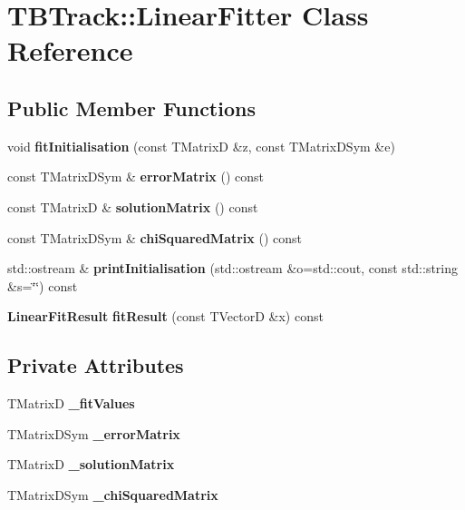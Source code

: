 \section{TBTrack::LinearFitter Class Reference}
\label{classTBTrack_1_1LinearFitter}
\subsection*{Public Member Functions}
\begin{DoxyCompactItemize}
\item 
void {\bfseries fitInitialisation} (const TMatrixD \&z, const TMatrixDSym \&e)\label{classTBTrack_1_1LinearFitter_af83e617778ace54723fba9d11eaad900}

\item 
const TMatrixDSym \& {\bfseries errorMatrix} () const \label{classTBTrack_1_1LinearFitter_ab3c00a9eb140ba63e0cae20e7db9df43}

\item 
const TMatrixD \& {\bfseries solutionMatrix} () const \label{classTBTrack_1_1LinearFitter_adb053f46cd4b1cabd89aafb802b14b4e}

\item 
const TMatrixDSym \& {\bfseries chiSquaredMatrix} () const \label{classTBTrack_1_1LinearFitter_a941c09f4b9d2976aa9b14ac1c9d55ccd}

\item 
std::ostream \& {\bfseries printInitialisation} (std::ostream \&o=std::cout, const std::string \&s=\char`\"{}\char`\"{}) const \label{classTBTrack_1_1LinearFitter_a458de2b57f0b458e007fab1eb04a3b71}

\item 
{\bf LinearFitResult} {\bfseries fitResult} (const TVectorD \&x) const \label{classTBTrack_1_1LinearFitter_a3609570379fc6b194cd8a576d5579be6}

\end{DoxyCompactItemize}
\subsection*{Private Attributes}
\begin{DoxyCompactItemize}
\item 
TMatrixD {\bfseries \_\-fitValues}\label{classTBTrack_1_1LinearFitter_a0d5ab614c1263e593037ebdd7fccf92d}

\item 
TMatrixDSym {\bfseries \_\-errorMatrix}\label{classTBTrack_1_1LinearFitter_a92f10ab1b7cc02975e9c84823e93af18}

\item 
TMatrixD {\bfseries \_\-solutionMatrix}\label{classTBTrack_1_1LinearFitter_af166aa8136a2aa0f60f47fa2e984f2cd}

\item 
TMatrixDSym {\bfseries \_\-chiSquaredMatrix}\label{classTBTrack_1_1LinearFitter_a86f7868c45931d0cc11e150bb81761c4}

\end{DoxyCompactItemize}


